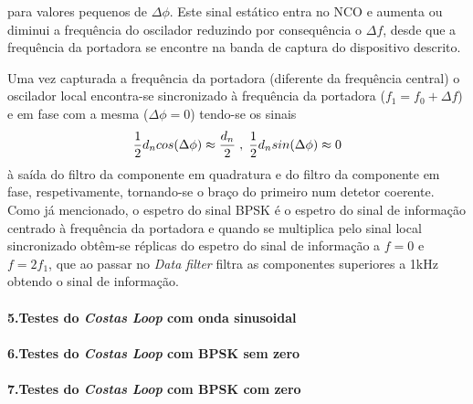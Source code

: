 \documentclass[11pt]{article}
\numberwithin{equation}{section}
\begin{document}
para valores pequenos de $\Delta\phi$. Este sinal estático entra no NCO e aumenta ou diminui a frequência do oscilador reduzindo por consequência o $\Delta f$, desde que a frequência da portadora se encontre na banda de captura do dispositivo descrito.

Uma vez capturada a frequência da portadora (diferente da frequência central) o oscilador local encontra-se sincronizado à frequência da portadora ($f_1 = f_0+\Delta f$) e em fase com a mesma ($\Delta\phi=0$) tendo-se os sinais
\begin{equation}
	\frac{1}{2}d_ncos(\Delta\phi)\approx\dfrac{d_n}{2} \hspace{1mm}, \hspace{1mm} \frac{1}{2}d_nsin(\Delta\phi)\approx 0
\end{equation}
 à saída do filtro da componente em quadratura e do filtro da componente em fase, respetivamente, tornando-se o braço do primeiro num detetor coerente. Como já mencionado, o espetro do sinal BPSK é o espetro do sinal de informação centrado à frequência da portadora e quando se multiplica pelo sinal local sincronizado obtêm-se réplicas do espetro do sinal de informação a $f=0$ e $f=2f_1$, que ao passar no \textit{Data filter} filtra as componentes superiores a 1kHz obtendo o sinal de informação.


\paragraph{5.Testes do \textit{Costas Loop} com onda sinusoidal} \hspace{0pt}


\paragraph{6.Testes do \textit{Costas Loop} com BPSK sem zero}

\paragraph{7.Testes do \textit{Costas Loop} com BPSK com zero} \hspace{0pt}
\end{document}
